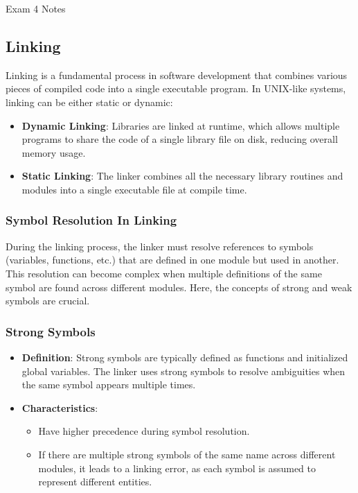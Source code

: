 \begin{examnotes}{Exam 4 Notes}
    \subsection*{Linking}

    Linking is a fundamental process in software development that combines various pieces of compiled code into a single executable program. In UNIX-like systems, linking can be either static or dynamic:

    \begin{itemize}
        \item \textbf{Dynamic Linking}: Libraries are linked at runtime, which allows multiple programs to share the code of a single library file on disk, reducing overall memory usage.
        \item \textbf{Static Linking}: The linker combines all the necessary library routines and modules into a single executable file at compile time.
    \end{itemize}

    \subsubsection*{Symbol Resolution In Linking}

    During the linking process, the linker must resolve references to symbols (variables, functions, etc.) that are defined in one module but used in another. This resolution can become complex when 
    multiple definitions of the same symbol are found across different modules. Here, the concepts of strong and weak symbols are crucial.

    \subsubsection*{Strong Symbols}

    \begin{itemize}
        \item \textbf{Definition}: Strong symbols are typically defined as functions and initialized global variables. The linker uses strong symbols to resolve ambiguities when the same symbol 
        appears multiple times.
        \item \textbf{Characteristics}:
        \begin{itemize}
            \item Have higher precedence during symbol resolution.
            \item If there are multiple strong symbols of the same name across different modules, it leads to a linking error, as each symbol is assumed to represent different entities.
        \end{itemize}
    \end{itemize}


\end{examnotes}
